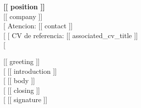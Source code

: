 \documentclass[11pt,a4paper]{article}
\begin{document}
{\LARGE \textbf{[[ position ]]}}\\[0.2em]
{\large [[ company ]]}\\[0.6em]
[%
Atencion: [[ contact ]]\\[0.6em]
[%
[%
CV de referencia: [[ associated_cv_title ]]\\[0.8em]
[%

[[ greeting ]]\\[1em]
[%
[[ introduction ]]\\[1em]
[%
[[ body ]]\\[1em]
[%
[[ closing ]]\\[1.4em]
[%
[[ signature ]]
\end{document}
